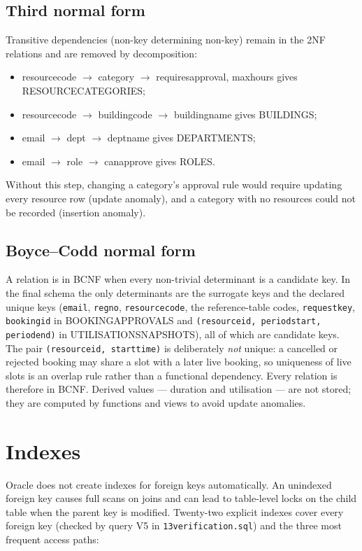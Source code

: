 \documentclass[12pt,a4paper,oneside]{report}
\renewcommand{\_}{\origus\allowbreak}
\begin{document}
\subsection{Third normal form}
Transitive dependencies (non-key determining non-key) remain in the 2NF relations and are removed by decomposition:
\begin{itemize}
  \item resource\_code $\rightarrow$ category $\rightarrow$ requires\_approval, max\_hours \quad gives RESOURCE\_CATEGORIES;
  \item resource\_code $\rightarrow$ building\_code $\rightarrow$ building\_name \quad gives BUILDINGS;
  \item email $\rightarrow$ dept $\rightarrow$ dept\_name \quad gives DEPARTMENTS;
  \item email $\rightarrow$ role $\rightarrow$ can\_approve \quad gives ROLES.
\end{itemize}
Without this step, changing a category's approval rule would require updating every resource row (update anomaly), and a category with no resources could not be recorded (insertion anomaly).

\subsection{Boyce--Codd normal form}
A relation is in BCNF when every non-trivial determinant is a candidate key. In the final schema the only determinants are the surrogate keys and the declared unique keys (\texttt{email}, \texttt{reg\_no}, \texttt{resource\_code}, the reference-table codes, \texttt{request\_key}, \texttt{booking\_id} in BOOKING\_APPROVALS and \texttt{(resource\_id, period\_start, period\_end)} in UTILISATION\_SNAPSHOTS), all of which are candidate keys. The pair \texttt{(resource\_id, start\_time)} is deliberately \emph{not} unique: a cancelled or rejected booking may share a slot with a later live booking, so uniqueness of live slots is an overlap rule rather than a functional dependency. Every relation is therefore in BCNF. Derived values --- duration and utilisation --- are not stored; they are computed by functions and views to avoid update anomalies.

\section{Indexes}
Oracle does not create indexes for foreign keys automatically. An unindexed foreign key causes full scans on joins and can lead to table-level locks on the child table when the parent key is modified. Twenty-two explicit indexes cover every foreign key (checked by query V5 in \texttt{13\_verification.sql}) and the three most frequent access paths:
\end{document}

